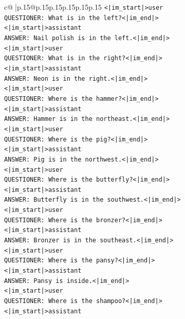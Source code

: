 \documentclass{article}
\begin{document}
{\begin{supertabular}{c@{$\;$}|p{.15\linewidth}@{}p{.15\linewidth}p{.15\linewidth}p{.15\linewidth}p{.15\linewidth}p{.15\linewidth}}
{{{\texttt{<|im\_start|>user} \\
\texttt{QUESTIONER: What is in the left?<|im\_end|>} \\
\texttt{<|im\_start|>assistant} \\
\texttt{ANSWER: Nail polish is in the left.<|im\_end|>} \\
\texttt{<|im\_start|>user} \\
\texttt{QUESTIONER: What is in the right?<|im\_end|>} \\
\texttt{<|im\_start|>assistant} \\
\texttt{ANSWER: Neon is in the right.<|im\_end|>} \\
\texttt{<|im\_start|>user} \\
\texttt{QUESTIONER: Where is the hammer?<|im\_end|>} \\
\texttt{<|im\_start|>assistant} \\
\texttt{ANSWER: Hammer is in the northeast.<|im\_end|>} \\
\texttt{<|im\_start|>user} \\
\texttt{QUESTIONER: Where is the pig?<|im\_end|>} \\
\texttt{<|im\_start|>assistant} \\
\texttt{ANSWER: Pig is in the northwest.<|im\_end|>} \\
\texttt{<|im\_start|>user} \\
\texttt{QUESTIONER: Where is the butterfly?<|im\_end|>} \\
\texttt{<|im\_start|>assistant} \\
\texttt{ANSWER: Butterfly is in the southwest.<|im\_end|>} \\
\texttt{<|im\_start|>user} \\
\texttt{QUESTIONER: Where is the bronzer?<|im\_end|>} \\
\texttt{<|im\_start|>assistant} \\
\texttt{ANSWER: Bronzer is in the southeast.<|im\_end|>} \\
\texttt{<|im\_start|>user} \\
\texttt{QUESTIONER: Where is the pansy?<|im\_end|>} \\
\texttt{<|im\_start|>assistant} \\
\texttt{ANSWER: Pansy is inside.<|im\_end|>} \\
\texttt{<|im\_start|>user} \\
\texttt{QUESTIONER: Where is the shampoo?<|im\_end|>} \\
\texttt{<|im\_start|>assistant} \\
}}}
\end{supertabular}}
\end{document}

